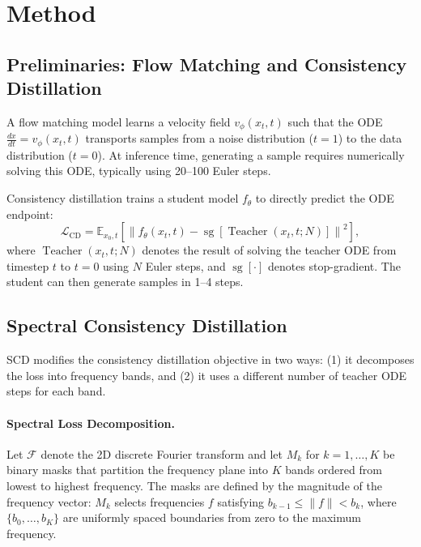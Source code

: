 \documentclass{article}
\newcommand{\scd}{\textsc{SCD}}
\newcommand{\E}{\mathbb{E}}
\newcommand{\Loss}{\mathcal{L}}
\begin{document}
\section{Method}
\label{sec:method}

\subsection{Preliminaries: Flow Matching and Consistency Distillation}

A flow matching model learns a velocity field $v_\phi(x_t, t)$ such that the ODE $\frac{dx}{dt} = v_\phi(x_t, t)$ transports samples from a noise distribution ($t=1$) to the data distribution ($t=0$). At inference time, generating a sample requires numerically solving this ODE, typically using 20--100 Euler steps.

Consistency distillation trains a student model $f_\theta$ to directly predict the ODE endpoint:
\begin{equation}
    \Loss_{\text{CD}} = \E_{x_0, t}\left[\left\|f_\theta(x_t, t) - \operatorname{sg}\left[\operatorname{Teacher}(x_t, t; N)\right]\right\|^2\right],
    \label{eq:cd}
\end{equation}
where $\operatorname{Teacher}(x_t, t; N)$ denotes the result of solving the teacher ODE from timestep $t$ to $t=0$ using $N$ Euler steps, and $\operatorname{sg}[\cdot]$ denotes stop-gradient. The student can then generate samples in 1--4 steps.

\subsection{Spectral Consistency Distillation}

\scd{} modifies the consistency distillation objective in two ways: (1) it decomposes the loss into frequency bands, and (2) it uses a different number of teacher ODE steps for each band.

\paragraph{Spectral Loss Decomposition.}
Let $\mathcal{F}$ denote the 2D discrete Fourier transform and let $M_k$ for $k=1, \ldots, K$ be binary masks that partition the frequency plane into $K$ bands ordered from lowest to highest frequency. The masks are defined by the magnitude of the frequency vector: $M_k$ selects frequencies $f$ satisfying $b_{k-1} \leq \|f\| < b_k$, where $\{b_0, \ldots, b_K\}$ are uniformly spaced boundaries from zero to the maximum frequency.
\end{document}
